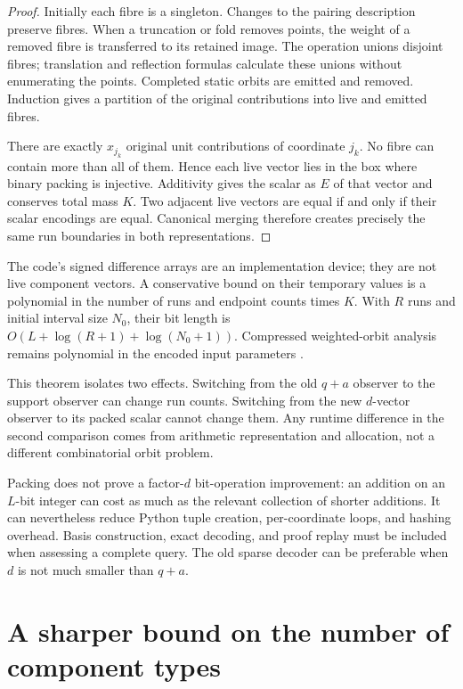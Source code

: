 \documentclass[11pt,a4paper]{article}
\theoremstyle{definition}
\begin{document}
\begin{proof}
Initially each fibre is a singleton.  Changes to the pairing description
preserve fibres.  When a truncation or fold removes points, the weight of a
removed fibre is transferred to its retained image.  The operation unions
disjoint fibres; translation and reflection formulas calculate these unions
without enumerating the points.  Completed static orbits are emitted and
removed.  Induction gives a partition of the original contributions into
live and emitted fibres.

There are exactly $x_{j_k}$ original unit contributions of coordinate $j_k$.
No fibre can contain more than all of them.  Hence each live vector lies in
the box where binary packing is injective.  Additivity gives the scalar as
$E$ of that vector and conserves total mass $K$.  Two adjacent live vectors
are equal if and only if their scalar encodings are equal.  Canonical merging
therefore creates precisely the same run boundaries in both representations.
\end{proof}

The code's signed difference arrays are an implementation device; they are
not live component vectors.  A conservative bound on their temporary values
is a polynomial in the number of runs and endpoint counts times $K$.  With
$R$ runs and initial interval size $N_0$, their bit length is
$O(L+\log(R+1)+\log(N_0+1))$.  Compressed weighted-orbit analysis remains
polynomial in the encoded input parameters \cite{AHT06}.

This theorem isolates two effects.  Switching from the old $q+a$ observer to
the support observer can change run counts.  Switching from the new $d$-vector
observer to its packed scalar cannot change them.  Any runtime difference in
the second comparison comes from arithmetic representation and allocation,
not a different combinatorial orbit problem.

Packing does not prove a factor-$d$ bit-operation improvement: an addition
on an $L$-bit integer can cost as much as the relevant collection of shorter
additions.  It can nevertheless reduce Python tuple creation, per-coordinate
loops, and hashing overhead.  Basis construction, exact decoding, and proof
replay must be included when assessing a complete query.  The old sparse
decoder can be preferable when $d$ is not much smaller than $q+a$.

\section{A sharper bound on the number of component types}
\label{sec:profiles}
\end{document}

